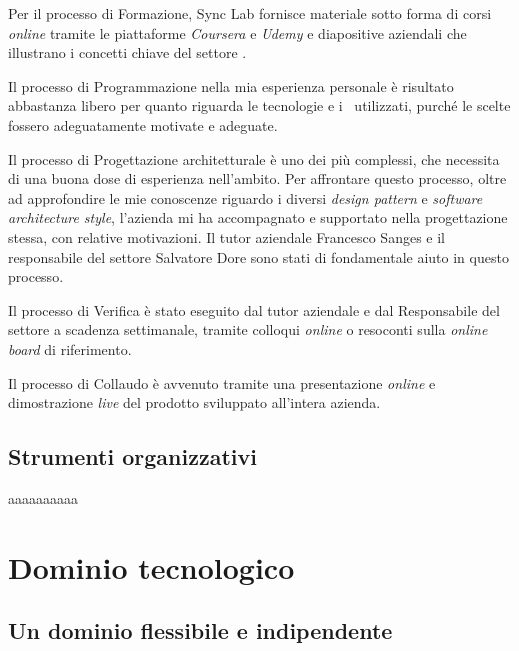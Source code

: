 Per il processo di Formazione, Sync Lab fornisce materiale sotto forma di corsi \textit{online} tramite le piattaforme \textit{Coursera} e \textit{Udemy} e diapositive aziendali che illustrano i concetti chiave del settore .

Il processo di Programmazione nella mia esperienza personale è risultato abbastanza libero per quanto riguarda le tecnologie e i \software\ utilizzati, purché le scelte fossero adeguatamente motivate e adeguate.

Il processo di Progettazione architetturale è uno dei più complessi, che necessita di una buona dose di esperienza nell'ambito.
Per affrontare questo processo, oltre ad approfondire le mie conoscenze riguardo i diversi \textit{design pattern} e \textit{software architecture style}, l'azienda mi ha accompagnato e supportato nella progettazione stessa, con relative motivazioni.
Il tutor aziendale  Francesco Sanges e il responsabile del settore  Salvatore Dore
sono stati di fondamentale aiuto in questo processo.

Il processo di Verifica è stato eseguito dal tutor aziendale e dal Responsabile del settore  a scadenza settimanale, tramite colloqui \textit{online} o resoconti sulla \textit{online board} di riferimento.

Il processo di Collaudo è avvenuto tramite una presentazione \textit{online} e dimostrazione \textit{live} del prodotto sviluppato all'intera azienda.

\subsection{Strumenti organizzativi}
aaaaaaaaaa
\section{Dominio tecnologico}

\subsection{Un dominio flessibile e indipendente}

